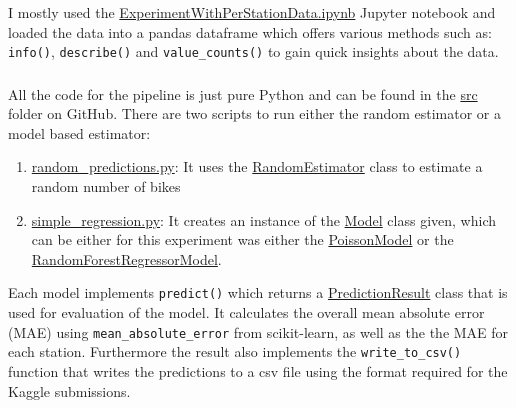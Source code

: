 \documentclass[a4paper]{article}
\begin{document}
    \subsubsection*{}
    I mostly used the
    \href{https://github.com/isabelladegen/mlp-2021/blob/main/notebooks/ExperimentWithPerStationData.ipynb}{ExperimentWithPerStationData.ipynb}
    Jupyter notebook and loaded the data into a pandas dataframe \cite{reback2020pandas} which offers various methods such as:
    \texttt{info()}, \texttt{describe()} and \texttt{value\_counts()} to gain quick insights about the data.

    \subsubsection*{}
    All the code for the pipeline is just pure Python and can be found in the
    \href{https://github.com/isabelladegen/mlp-2021/tree/main/src}{src} folder on GitHub. There are two
    scripts to run either the random estimator or a model based estimator:
    \begin{enumerate}
        \item \href{https://github.com/isabelladegen/mlp-2021/blob/main/src/random_predictions.py}{random\_predictions.py}:
        It uses the \href{https://github.com/isabelladegen/mlp-2021/blob/c48d85dc364b5a2e7e59f16961b32f9e6c245735/src/models/RandomEstimator.py}{RandomEstimator}
        class to estimate a random number of bikes
        \item \href{https://github.com/isabelladegen/mlp-2021/blob/main/src/simple_regression.py}{simple\_regression.py}: It creates
        an instance of the \href{https://github.com/isabelladegen/mlp-2021/blob/main/src/models/Model.py}{Model} class given, which
        can be either for this experiment was either the \href{https://github.com/isabelladegen/mlp-2021/blob/main/src/models/PoissonModel.py}{PoissonModel}
        or the \href{https://github.com/isabelladegen/mlp-2021/blob/main/src/models/RandomForestRegressorModel.py}{RandomForestRegressorModel}.
    \end{enumerate}

    Each model implements \texttt{predict()} which returns a  \href{https://github.com/isabelladegen/mlp-2021/blob/c48d85dc364b5a2e7e59f16961b32f9e6c245735/src/PredictionResult.py}{PredictionResult}
    class that is used for evaluation of the model. It calculates the overall mean absolute error (MAE) using \texttt{mean\_absolute\_error}
    from scikit-learn, as well as the the MAE for each station. Furthermore the result also implements the
    \texttt{write\_to\_csv()} function that writes the predictions to a csv file using the format required for the Kaggle submissions.
\end{document}
